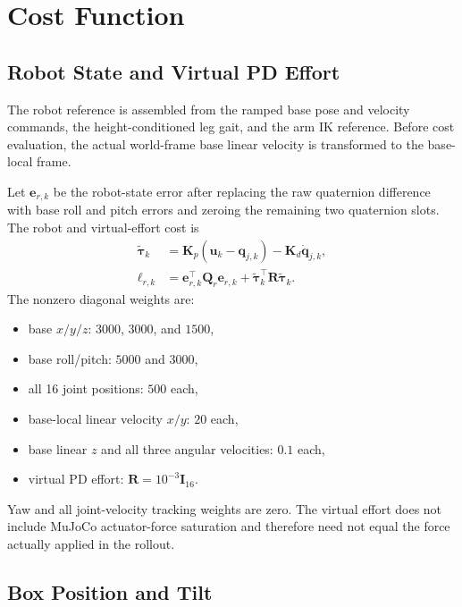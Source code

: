 \documentclass[11pt,a4paper]{article}
\begin{document}
\section{Cost Function}

\subsection{Robot State and Virtual PD Effort}

The robot reference is assembled from the ramped base pose and velocity
commands, the height-conditioned leg gait, and the arm IK reference. Before
cost evaluation, the actual world-frame base linear velocity is transformed
to the base-local frame.

Let $\bm{e}_{r,k}$ be the robot-state error after replacing the raw quaternion
difference with base roll and pitch errors and zeroing the remaining two
quaternion slots. The robot and virtual-effort cost is
\begin{align}
  \tilde{\bm{\tau}}_k
  &=\bm{K}_p(\bm{u}_k-\bm{q}_{j,k})
    -\bm{K}_d\dot{\bm{q}}_{j,k},\\
  \ell_{r,k}
  &=\bm{e}_{r,k}^{\top}\bm{Q}_r\bm{e}_{r,k}
    +\tilde{\bm{\tau}}_k^\top\bm{R}\tilde{\bm{\tau}}_k.
\end{align}
The nonzero diagonal weights are:
\begin{itemize}
  \item base $x/y/z$: $3000$, $3000$, and $1500$,
  \item base roll/pitch: $5000$ and $3000$,
  \item all 16 joint positions: $500$ each,
  \item base-local linear velocity $x/y$: $20$ each,
  \item base linear $z$ and all three angular velocities: $0.1$ each,
  \item virtual PD effort: $\bm{R}=10^{-3}\bm{I}_{16}$.
\end{itemize}
Yaw and all joint-velocity tracking weights are zero. The virtual effort does
not include MuJoCo actuator-force saturation and therefore need not equal the
force actually applied in the rollout.

\subsection{Box Position and Tilt}
\end{document}
